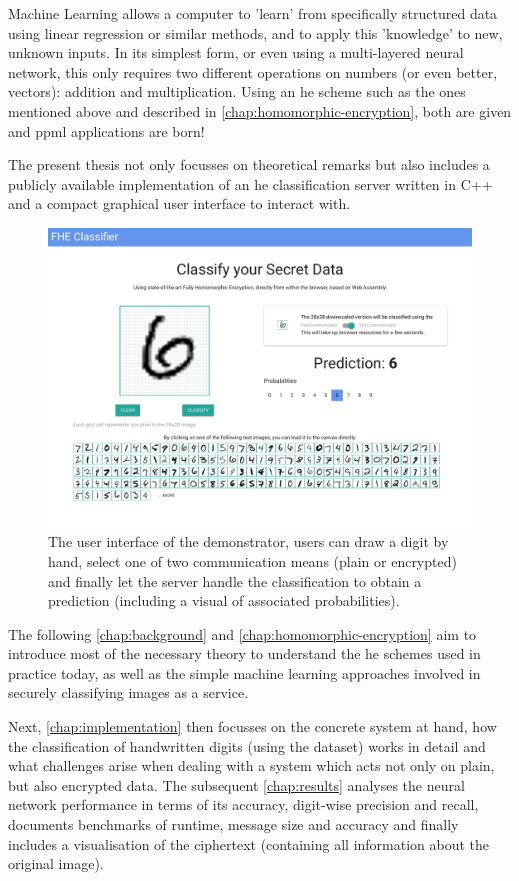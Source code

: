 Machine Learning allows a computer to 'learn' from specifically structured data using linear regression or similar methods, and to apply this 'knowledge' to new, unknown inputs.
In its simplest form, or even using a multi-layered neural network, this only requires two different operations on numbers (or even better, vectors): addition and multiplication.
Using an \gls{he} scheme such as the ones mentioned above and described in \autoref{chap:homomorphic-encryption}, both are given and \gls{ppml} applications are born!

The present thesis not only focusses on theoretical remarks but also includes a publicly available implementation of an \gls{he} classification server written in C++ and a compact graphical user interface to interact with.

\begin{figure}[H]
  \centering
  \label{fig:frontend}
  \includegraphics[width=\linewidth]{figures/frontend.pdf}
  \vspace{-1.2cm}
  \caption{The user interface of the demonstrator, users can draw a digit by hand, select one of two communication means (plain or encrypted) and finally let the server handle the classification to obtain a prediction (including a visual of associated probabilities).}
\end{figure}

The following \autoref{chap:background} and \autoref{chap:homomorphic-encryption} aim to introduce most of the necessary theory to understand the \gls{he} schemes used in practice today, as well as the simple machine learning approaches involved in securely classifying images as a service.

Next, \autoref{chap:implementation} then focusses on the concrete system at hand, how the classification of handwritten digits (using the  dataset) works in detail and what challenges arise when dealing with a system which acts not only on plain, but also encrypted data.
The subsequent \autoref{chap:results} analyses the neural network performance in terms of its accuracy, digit-wise precision and recall, documents benchmarks of runtime, message size and accuracy and finally includes a visualisation of the ciphertext (containing all information about the original image).
